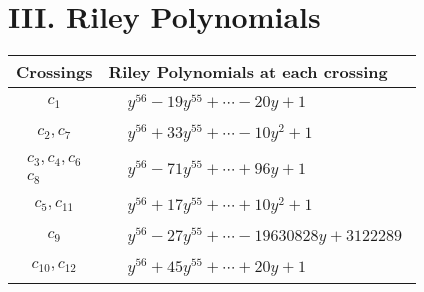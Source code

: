 \documentclass[1p]{elsarticle_modified}
\theoremstyle{definition}
\begin{document}
\centering \section*{ III. Riley Polynomials}
\begin{tabular}{m{50pt}|m{274pt}}
Crossings & \hspace{64pt}Riley Polynomials at each crossing \\
\hline $$\begin{aligned}c_{1}\end{aligned}$$&$\begin{aligned}
&y^{56}-19 y^{55}+\cdots-20 y+1
\end{aligned}$\\
\hline $$\begin{aligned}c_{2},c_{7}\end{aligned}$$&$\begin{aligned}
&y^{56}+33 y^{55}+\cdots-10 y^2+1
\end{aligned}$\\
\hline $$\begin{aligned}c_{3},c_{4},c_{6}\\c_{8}\end{aligned}$$&$\begin{aligned}
&y^{56}-71 y^{55}+\cdots+96 y+1
\end{aligned}$\\
\hline $$\begin{aligned}c_{5},c_{11}\end{aligned}$$&$\begin{aligned}
&y^{56}+17 y^{55}+\cdots+10 y^2+1
\end{aligned}$\\
\hline $$\begin{aligned}c_{9}\end{aligned}$$&$\begin{aligned}
&y^{56}-27 y^{55}+\cdots-19630828 y+3122289
\end{aligned}$\\
\hline $$\begin{aligned}c_{10},c_{12}\end{aligned}$$&$\begin{aligned}
&y^{56}+45 y^{55}+\cdots+20 y+1
\end{aligned}$\\
\hline
\end{tabular}
\vskip 2pc
\end{document}

